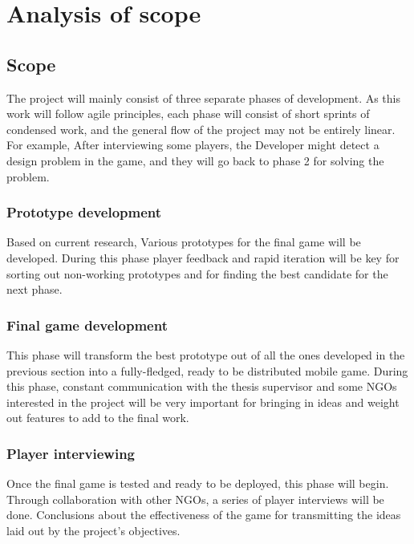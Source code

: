 \section{Analysis of scope}

\subsection{Scope}

The project will mainly consist of three separate phases of development. As this work will follow agile principles, each phase will consist of short sprints of condensed work, and the general flow of the project may not be entirely linear. For example, After interviewing some players, the Developer might detect a design problem in the game, and they will go back to phase 2 for solving the problem.

\subsubsection{Prototype development}

Based on current research, Various prototypes for the final game will be developed. During this phase player feedback and rapid iteration will be key for sorting out non-working prototypes and for finding the best candidate for the next phase. 

\subsubsection{Final game development}

This phase will transform the best prototype out of all the ones developed in the previous section into a fully-fledged, ready to be distributed mobile game. During this phase, constant communication with the thesis supervisor and some \glspl{NGO} interested in the project will be very important for bringing in ideas and weight out features to add to the final work. 

\subsubsection{Player interviewing}

Once the final game is tested and ready to be deployed, this phase will begin. Through collaboration with other \glspl{NGO}, a series of player interviews will be done. Conclusions about the effectiveness of the game for transmitting the ideas laid out by the project's objectives.

